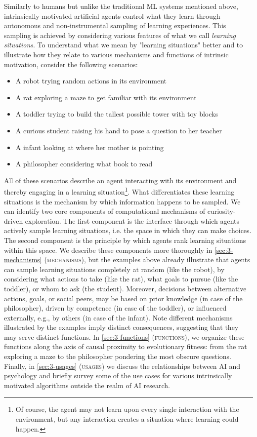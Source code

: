 Similarly to humans but unlike the traditional \ac{ML} systems mentioned above, intrinsically motivated artificial agents control what they learn through autonomous and non-instrumental sampling of learning experiences. This sampling is achieved by considering various features of what we call \emph{learning situations}. To understand what we mean by "learning situations" better and to illustrate how they relate to various mechanisms and functions of intrinsic motivation, consider the following scenarios:

\begin{itemize}
    \item A robot trying random actions in its environment
    \item A rat exploring a maze to get familiar with its environment
    \item A toddler trying to build the tallest possible tower with toy blocks
    \item A curious student raising his hand to pose a question to her teacher
    \item A infant looking at where her mother is pointing
    \item A philosopher considering what book to read
\end{itemize}

All of these scenarios describe an agent interacting with its environment and thereby engaging in a learning situation\footnote{Of course, the agent may not learn upon every single interaction with the environment, but any interaction creates a situation where learning could happen.}. What differentiates these learning situations is the mechanism by which information happens to be sampled. We can identify two core components of computational mechanisms of curiosity-driven exploration. The first component is the interface through which agents actively sample learning situations, i.e. the space in which they can make choices. The second component is the principle by which agents rank learning situations within this space. We describe these components more thoroughly in \autoref{sec:3-mechanisms} (\textsc{mechanisms}), but the examples above already illustrate that agents can sample learning situations completely at random (like the robot), by considering what actions to take (like the rat), what goals to pursue (like the toddler), or whom to ask (the student). Moreover, decisions between alternative actions, goals, or social peers, may be based on prior knowledge (in case of the philosopher), driven by competence (in case of the toddler), or influenced externally, e.g., by others (in case of the infant). Note different mechanisms illustrated by the examples imply distinct consequences, suggesting  that they may serve distinct functions. In \autoref{sec:3-functions} (\textsc{functions}), we organize these functions along the axis of causal proximity to evolutionary fitness: from the rat exploring a maze to the philosopher pondering the most obscure questions. Finally, in \autoref{sec:3-usages} (\textsc{usages}) we discuss the relationships between \ac{AI} and psychology and briefly survey some of the use cases for various intrinsically motivated algorithms outside the realm of \ac{AI} research.

